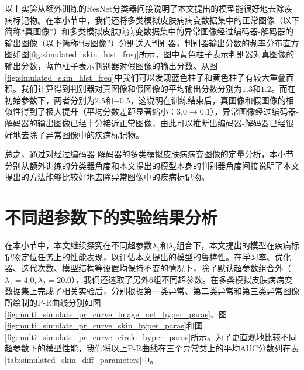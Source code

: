 以上实验从额外训练的ResNet分类器间接说明了本文提出的模型能很好地去除疾病标记物。在本小节中，我们还将多类模拟皮肤病病变数据集中的正常图像（以下简称“真图像”）和多类模拟皮肤病病变数据集中的异常图像经过编码器-解码器的输出图像（以下简称“假图像”）分别送入判别器，判别器输出分数的频率分布直方图如图\ref{fig:simulated_skin_hist_freq}所示，图中黄色柱子表示判别器对真图像的输出分数，蓝色柱子表示判别器对假图像的输出分数。从图\ref{fig:simulated_skin_hist_freq}中我们可以发现蓝色柱子和黄色柱子有较大重叠面积。我们计算得到判别器对真图像和假图像的平均输出分数分别为$1.3 $和$1.2$。而在初始参数下，两者分别为$2.5$和$-0.5$，这说明在训练结束后，真图像和假图像的相似性得到了极大提升（平均分数差距显著缩小：$3.0\rightarrow 0.1$），异常图像经过编码器-解码器的输出图像已经十分接近正常图像，由此可以推断出编码器-解码器已经很好地去除了异常图像中的疾病标记物。

总之，通过对经过编码器-解码器的多类模拟皮肤病病变图像的定量分析，本小节分别从额外训练的分类器角度和本文提出的模型本身的判别器角度间接说明了本文提出的方法能够比较好地去除异常图像中的疾病标记物。
\section{不同超参数下的实验结果分析}\label{sec:multi_classes_hyper_paras}
在本小节中，本文继续探究在不同超参数$\lambda_{1}$和$\lambda_{2}$组合下，本文提出的模型在疾病标记物定位任务上的性能表现，以评估本文提出的模型的鲁棒性。在学习率、优化器、迭代次数、模型结构等设置均保持不变的情况下，除了默认超参数组合外（$\lambda_{1}=4.0,\lambda_{2}=20.0$），我们还选取了另外$6$组不同超参数。在多类模拟皮肤病病变数据集上完成了相关实验后，分别根据第一类异常、第二类异常和第三类异常图像所绘制的P-R曲线分别如图\ref{fig:multi_simulate_pr_curve_image_net_hyper_paras}、图\ref{fig:multi_simulate_pr_curve_skin_hyper_paras}和图\ref{fig:multi_simulate_pr_curve_circle_hyper_paras}所示。为了更直观地比较不同超参数下的模型性能，我们将以上P-R曲线在三个异常类上的平均AUC分数列在表\ref{tab:simulated_skin_diff_parameters}中。

